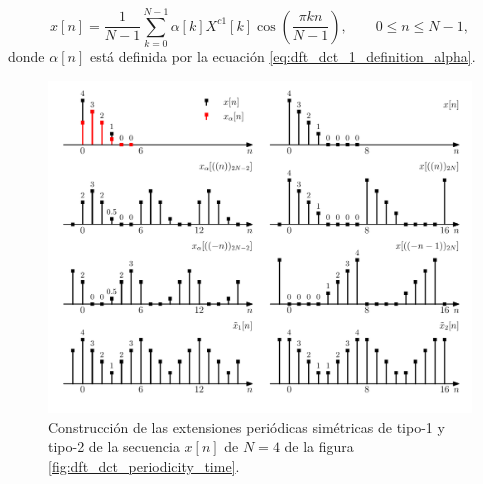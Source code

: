 \documentclass[a4paper]{report}
\begin{document}
\begin{equation}\label{eq:dft_dct_1_inverse_definition}
 x[n]=\frac{1}{N-1}\sum_{k=0}^{N-1}\alpha[k]X^{c1}[k]\cos\left(\frac{\pi k n}{N-1}\right),
 \qquad 0\leq n\leq N-1,
\end{equation}
donde \(\alpha[n]\) está definida por la ecuación \ref{eq:dft_dct_1_definition_alpha}.
\begin{figure}[!htb]
 \begin{center}
 \includegraphics[width=\textwidth]{figuras/dft_dct_periodicity_types_1_2_construction.pdf}
 \caption{\label{fig:dft_dct_periodicity_types_1_2_construction} Construcción de las extensiones periódicas simétricas de tipo-1 y tipo-2 de la secuencia \(x[n]\) de \(N=4\) de la figura \ref{fig:dft_dct_periodicity_time}.}
 \end{center}
\end{figure}
\end{document}
